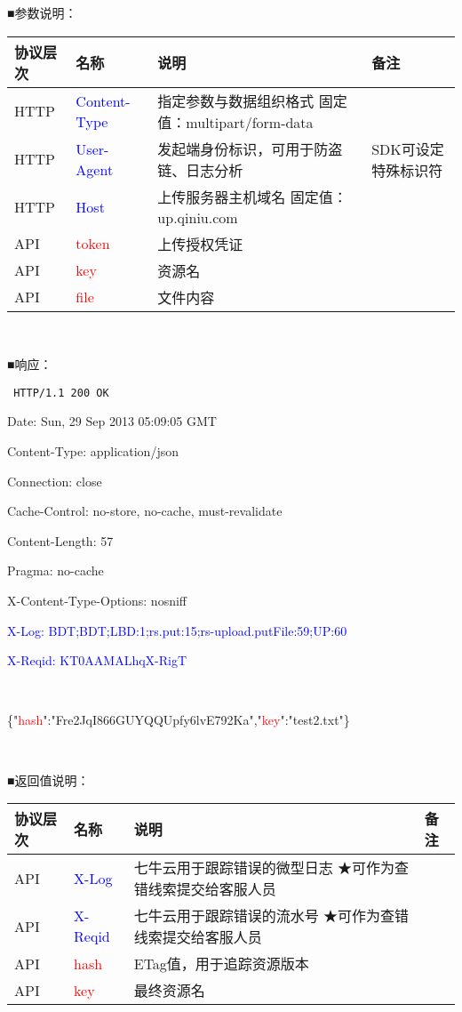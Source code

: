 \documentclass[11pt, oneside]{book}
\newcommand{\qpara}[1]{
\vspace{0.2em}
\begin{spacing}{1.35}
\noindent
#1\par
\end{spacing}
\vspace{0.2em}
}
\newcommand{\qblock}[1]{
\vspace{0.1em}
\noindent
#1\par
\vspace{0.1em}
}
\newcommand{\qtable}[1]{\footnotesize\vspace{0.5em}#1\vspace{0.5em}\normalsize}
\newcommand{\qhttp}[1]{\noindent #1\par}
\begin{document}
\qblock{■\thinspace 参数说明：}
\qtable{
\def\arraystretch{2}
\begin{tabular}{|l|p{7em}|p{19em}|p{7em}|}
\hline
协议层次 & 名称 & 说明 & 备注 \\
\hline
HTTP & \textcolor{blue}{Content-Type} & 指定参数与数据组织格式 \newline 固定值：multipart/form-data & \\
\hline
HTTP & \textcolor{blue}{User-Agent} & 发起端身份标识，可用于防盗链、日志分析 & SDK可设定特殊标识符 \\
\hline
HTTP & \textcolor{blue}{Host} & 上传服务器主机域名 \newline 固定值：up.qiniu.com & \\
\hline
API & \textcolor{red}{token} & 上传授权凭证 & \\
\hline
API & \textcolor{red}{key} & 资源名 & \\
\hline
API & \textcolor{red}{file} & 文件内容 & \\
\hline
\end{tabular}
}

\qpara{\ }

\qblock{■\thinspace 响应：}
{
\tt \footnotesize
\qhttp{HTTP/1.1 200 OK}
\qhttp{Date: Sun, 29 Sep 2013 05:09:05 GMT}
\qhttp{Content-Type: application/json}
\qhttp{Connection: close}
\qhttp{Cache-Control: no-store, no-cache, must-revalidate}
\qhttp{Content-Length: 57}
\qhttp{Pragma: no-cache}
\qhttp{X-Content-Type-Options: nosniff}
\qhttp{\textcolor{blue}{X-Log: BDT;BDT;LBD:1;rs.put:15;rs-upload.putFile:59;UP:60}}
\qhttp{\textcolor{blue}{X-Reqid: KT0AAMALhqX-RigT}}
\qhttp{\ }
\qhttp{\{"\textcolor{red}{hash}":"Fre2JqI866GUYQQUpfy6lvE792Ka","\textcolor{red}{key}":"test2.txt"\}}
\qhttp{\ }
}

\qblock{■\thinspace 返回值说明：}
\qtable{
\def\arraystretch{2}
\begin{tabular}{|l|p{7em}|p{19em}|p{7em}|}
\hline
协议层次 & 名称 & 说明 & 备注 \\
\hline
API & \textcolor{blue}{X-Log} & 七牛云用于跟踪错误的微型日志 \newline ★可作为查错线索提交给客服人员 & \\
\hline
API & \textcolor{blue}{X-Reqid} & 七牛云用于跟踪错误的流水号 \newline ★可作为查错线索提交给客服人员 & \\
\hline
API & \textcolor{red}{hash} & ETag值，用于追踪资源版本 & \\
\hline
API & \textcolor{red}{key} & 最终资源名 & \\
\hline
\end{tabular}
}
\end{document}
